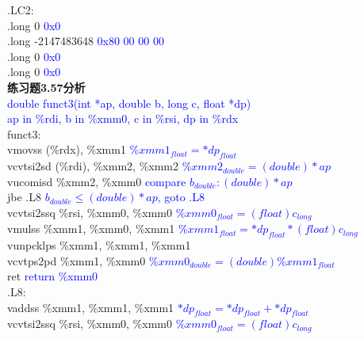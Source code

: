 \documentclass{article}
\newcommand{\blue}[1]{\textcolor{blue}{#1}}
\begin{document}
\begin{CJK}{UTF8}{gbsn}
.LC2:	\\
	\hspace*{1em}.long	0 \blue{0x0}	\\
	\hspace*{1em}.long	-2147483648 \blue{0x80 00 00 00}	\\
	\hspace*{1em}.long	0 \blue{0x0}	\\
	\hspace*{1em}.long	0 \blue{0x0}	\\[3ex]
\textbf{练习题3.57分析}	\\
\blue{double funct3(int *ap, double b, long c, float *dp)}	\\
\blue{ap in \%rdi, b in \%xmm0, c in \%rsi, dp in \%rdx}	\\
funct3:	\\
	\hspace*{1em}vmovss	(\%rdx), \%xmm1 \blue{$\%xmm1_{float}=*dp_{float}$}	\\
	\hspace*{1em}vcvtsi2sd	(\%rdi), \%xmm2, \%xmm2 \blue{$\%xmm2_{double}=(double)*ap$}	\\
	\hspace*{1em}vucomisd	\%xmm2, \%xmm0 \blue{compare $b_{double}:(double)*ap$}	\\
	\hspace*{1em}jbe	.L8 \blue{$b_{double}\le(double)*ap$, goto .L8}	\\
	\hspace*{1em}vcvtsi2ssq	\%rsi, \%xmm0, \%xmm0 \blue{$\%xmm0_{float}=(float)c_{long}$}	\\
	\hspace*{1em}vmulss	\%xmm1, \%xmm0, \%xmm1 \blue{$\%xmm1_{float}=*dp_{float}*(float)c_{long}$}	\\
	\hspace*{1em}vunpcklps	\%xmm1, \%xmm1, \%xmm1 \blue{}	\\
	\hspace*{1em}vcvtps2pd	\%xmm1, \%xmm0 \blue{$\%xmm0_{double}=(double)\%xmm1_{float}$}	\\
	\hspace*{1em}ret \blue{return \%xmm0}	\\
.L8:	\\
\hspace*{1em}vaddss	\%xmm1, \%xmm1, \%xmm1 \blue{$*dp_{float}=*dp_{float}+*dp_{float}$}	\\
	\hspace*{1em}vcvtsi2ssq	\%rsi, \%xmm0, \%xmm0 \blue{$\%xmm0_{float}=(float)c_{long}$}	\\

\end{CJK}
\end{document}
